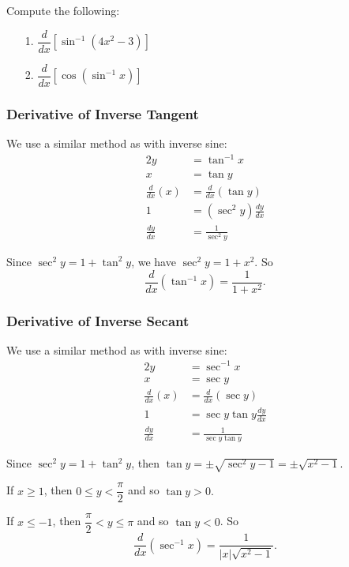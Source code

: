 \documentclass[14pt]{beamer}
\begin{document}
\begin{frame}[t]

Compute the following:

\begin{itemize}

\item[1.] $\dfrac{d}{dx} \left[ \sin^{-1}(4x^2-3) \right]$
\vspace{1in}
\item[2.] $\dfrac{d}{dx} \left[ \cos(\sin^{-1}x) \right]$

\end{itemize}

\end{frame}

\begin{frame}

\frametitle{Derivative of Inverse Tangent}

We use a similar method as with inverse sine:
\begin{alignat*}{2}
y &= \tan^{-1}x \\
x &= \tan y \\
\frac{d}{dx}(x) &= \frac{d}{dx} (\tan y) \\
1 &= (\sec^2 y) \frac{dy}{dx} \\
\frac{dy}{dx} &= \frac{1}{\sec^2 y}
\end{alignat*}

\bigskip

Since $\sec^2 y=1+\tan^2 y$, we have $\sec^2 y=1+x^2.$  So 
$$\frac{d}{dx}(\tan^{-1} x)=\frac{1}{1+x^2}.$$

\end{frame}

\begin{frame}

\frametitle{Derivative of Inverse Secant}

We use a similar method as with inverse sine:
\begin{alignat*}{2}
y &= \sec^{-1}x \\
x &= \sec y \\
\frac{d}{dx}(x) &= \frac{d}{dx} (\sec y) \\
1 &= \sec y \tan y \frac{dy}{dx} \\
\frac{dy}{dx} &= \frac{1}{\sec y \tan y}
\end{alignat*}

\end{frame}

\begin{frame}

Since $\sec^2 y=1+\tan^2 y$, then $\tan y=\pm\sqrt{\sec^2 y-1}=\pm\sqrt{x^2-1}.$  

\bigskip

If $x \ge 1$, then $0\le y<\dfrac{\pi}{2}$ and so $\tan y >0.$  

\bigskip
  
If $x \le -1$, then $\dfrac{\pi}{2} < y \le \pi$ and so  $\tan y <0$.  So 
$$\frac{d}{dx}(\sec^{-1} x)=\frac{1}{|x|\sqrt{x^2-1}}.$$

\end{frame}
\end{document}
